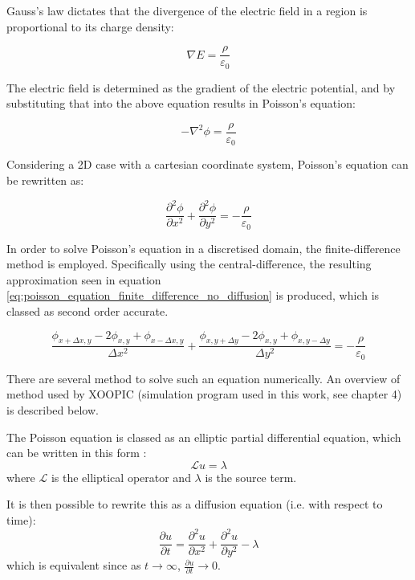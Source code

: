 Gauss's law dictates that the divergence of the electric field in a region is proportional to its charge density:

\begin{equation}
	\nabla E = \frac{\rho}{\varepsilon_0}
\end{equation}

The electric field is determined as the gradient of the electric potential, and by substituting that into the above equation results in Poisson's equation:

\begin{equation}
	-\nabla^2 \phi = \frac{\rho}{\varepsilon_0}
\end{equation}

Considering a 2D case with a cartesian coordinate system, Poisson's equation can be rewritten as:

\begin{equation}
	\frac{\partial ^2 \phi}{\partial x^2} + \frac{\partial^2 \phi}{\partial y^2} = -\frac{\rho}{\varepsilon_0}
\end{equation}

In order to solve Poisson's equation in a discretised domain, the finite-difference method is employed. Specifically using the central-difference, the resulting approximation seen in equation \ref{eq:poisson_equation_finite_difference_no_diffusion} is produced, which is classed as second order accurate. 

\begin{equation}
	\frac{\phi_{x + \Delta x, y} - 2\phi_{x,y} + \phi_{x - \Delta x, y}}{\Delta x^2} + \frac{\phi_{x, y + \Delta y} - 2\phi_{x,y} + \phi_{x, y - \Delta y}}{\Delta y^2} = -\frac{\rho}{\varepsilon_0}
	\label{eq:poisson_equation_finite_difference_no_diffusion}
\end{equation}

There are several method to solve such an equation numerically. An overview of method used by XOOPIC (simulation program used in this work, see chapter 4) is described below. 

The Poisson equation is classed as an elliptic partial differential equation, which can be written in this form \cite{Press1988C19}:
\begin{equation}
	\mathcal{L}u = \lambda
\end{equation}
where $\mathcal{L}$ is the elliptical operator and $\lambda$ is the source term.

It is then possible to rewrite this as a diffusion equation (i.e. with respect to time):
\begin{equation}
	\frac{\partial u}{\partial t} = \frac{\partial^2 u}{\partial x^2} +\frac{\partial^2 u}{\partial y^2} - \lambda
	\label{eq:diffusion_equation}
\end{equation}
which is equivalent since as $t \to \infty$, $\frac{\partial u}{\partial t} \to 0$.

